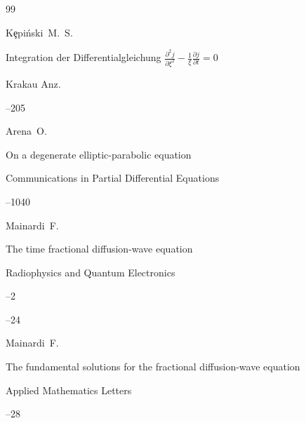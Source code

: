 \begin{thebibliography}{99}




\by K\c{e}pi\'nski~M.~S.

\paper Integration der Differentialgleichung $\frac{\partial^2 j }{\partial \xi^2}-\frac{1}{\xi}

\frac{\partial j }{\partial t}=0$ 

\inbook  Krakau Anz. 


--205





\by Arena~O.

\paper On a degenerate elliptic-parabolic equation

\jour Communications in Partial Differential Equations




--1040 





\by Mainardi~F.

\paper The time fractional diffusion-wave equation

\jour Radiophysics and Quantum Electronics


--2


--24





\by Mainardi~F.

\paper The fundamental solutions for the fractional diffusion-wave equation

\jour Applied Mathematics Letters




--28





\end{thebibliography}
